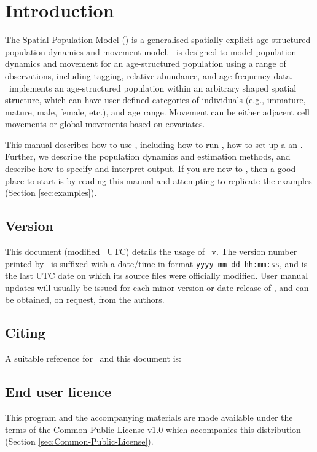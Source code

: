 \section{Introduction\label{sec:Introduction}}

The Spatial Population Model (\SPM) is a generalised spatially explicit age-structured population dynamics and movement model. \SPM\ is designed to model population dynamics and movement for an age-structured population using a range of observations, including tagging, relative abundance, and age frequency data. \SPM\ implements an age-structured population within an arbitrary shaped spatial structure, which can have user defined categories of individuals (e.g., immature, mature, male, female, etc.), and age range. Movement can be either adjacent cell movements or global movements based on covariates. 

This manual describes how to use \SPM, including how to run \SPM, how to set up a an \config. Further, we describe the population dynamics and estimation methods, and describe how to specify and interpret output. If you are new to \SPM, then a good place to start is by reading this manual and attempting to replicate the examples (Section \ref{sec:examples}).

\subsection{Version}

This document (modified \SourceControlDate \SourceControlTime\ UTC) details the usage of \SPM\ v\VER. The version number printed by \SPM\ is suffixed with a date/time in format \texttt{yyyy-mm-dd hh:mm:ss}, and is the last UTC date on which its source files were officially modified. User manual updates will usually be issued for each minor version or date release of \SPM, and can be obtained, on request, from the authors.

\subsection{Citing \SPM}

A suitable reference for \SPM\ and this document is: 

\ManualRef

\subsection{End user licence}

This program and the accompanying materials are made available under the terms of the \href{http://www.opensource.org/licenses/cpl1.0.php}{Common Public License v1.0} which accompanies this distribution (Section \ref{sec:Common-Public-License}).

